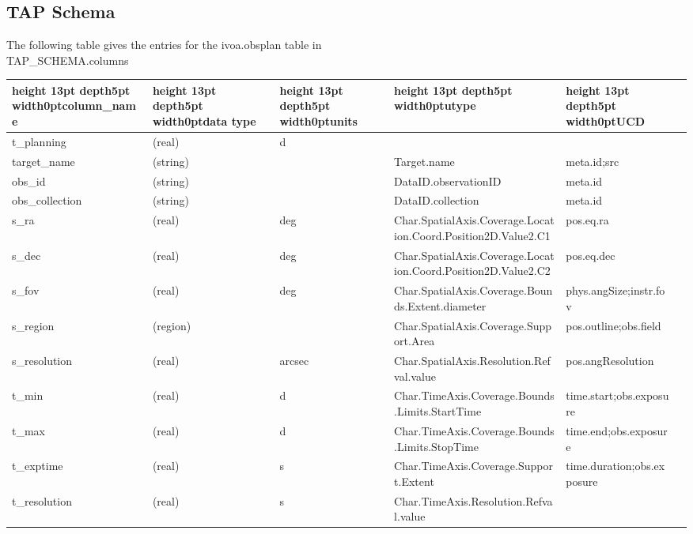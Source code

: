 \documentclass[11pt,a4paper]{ivoa}
\begin{document}
\subsection{TAP Schema}
The following table gives the entries for the ivoa.obsplan table in\\
TAP\_SCHEMA.columns

\begin{landscape}
\begin{table}
\def\hlstrut{\vrule height 13pt depth5pt width0pt}
\begin{tabular}{ |l|l|l|l|l|l| }
\hline
\hlstrut\textbf{column\_name} &
\hlstrut\textbf{data type} &
\hlstrut\textbf{units} &
\hlstrut\textbf{utype} &
\hlstrut\textbf{UCD} \\
\hline
t\_planning &
(real) &
d &
&
\\
\hline
target\_name &
(string) &
&
Target.name &
meta.id;src \\
\hline
obs\_id &
(string) &
&
DataID.observationID &
meta.id \\
\hline
obs\_collection &
(string) &
&
DataID.collection &
meta.id \\
\hline
s\_ra &
(real) &
deg &
Char.SpatialAxis.Coverage.Location.Coord.Position2D.Value2.C1 &
pos.eq.ra \\
\hline
s\_dec &
(real) &
deg &
Char.SpatialAxis.Coverage.Location.Coord.Position2D.Value2.C2 &
pos.eq.dec \\
\hline
s\_fov &
(real) &
deg &
Char.SpatialAxis.Coverage.Bounds.Extent.diameter &
phys.angSize;instr.fov \\
\hline
s\_region &
(region) &
&
Char.SpatialAxis.Coverage.Support.Area &
pos.outline;obs.field \\
\hline
s\_resolution &
(real) &
arcsec &
Char.SpatialAxis.Resolution.Refval.value &
pos.angResolution \\
\hline
t\_min &
(real) &
d &
Char.TimeAxis.Coverage.Bounds.Limits.StartTime &
time.start;obs.exposure \\
\hline
t\_max &
(real) &
d &
Char.TimeAxis.Coverage.Bounds.Limits.StopTime &
time.end;obs.exposure \\
\hline
t\_exptime &
(real) &
s &
Char.TimeAxis.Coverage.Support.Extent &
time.duration;obs.exposure \\
\hline
t\_resolution &
(real) &
s &
Char.TimeAxis.Resolution.Refval.value &

\end{tabular}
\end{table}
\end{landscape}
\end{document}
